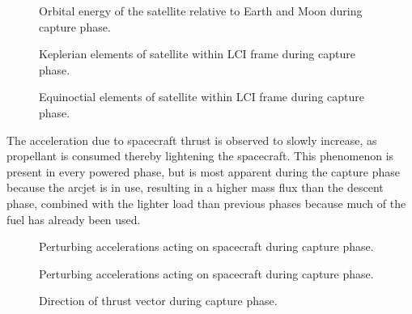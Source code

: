 \begin{figure}
\centering
\def\svgwidth{\figurewidth}

\caption{Orbital energy of the satellite relative to Earth and Moon during capture phase.}
\label{fig:Capture-orbeng}
\end{figure}

\begin{figure}
\centering
\def\svgwidth{\figurewidth}

\caption{Keplerian elements of satellite within LCI frame during capture phase.}
\label{fig:Capture-kep-lci}
\end{figure}

\begin{figure}
\centering
\def\svgwidth{\figurewidth}

\caption{Equinoctial elements of satellite within LCI frame during capture phase.}
\label{fig:Capture-mee}
\end{figure}

The acceleration due to spacecraft thrust is observed to slowly increase, as propellant is consumed thereby lightening the spacecraft. This phenomenon is present in every powered phase, but is most apparent during the capture phase because the arcjet is in use, resulting in a higher mass flux than the descent phase, combined with the lighter load than previous phases because much of the fuel has already been used.

\begin{figure}
\centering
\def\svgwidth{\figurewidth}

\caption{Perturbing accelerations acting on spacecraft during capture phase.}
\label{fig:Capture-pert}
\end{figure}

\begin{figure}
\centering
\def\svgwidth{\figurewidth}

\caption{Perturbing accelerations acting on spacecraft during capture phase.}
\label{fig:Capture-pert2}
\end{figure}

\begin{figure}
\centering
\def\svgwidth{\figurewidth}

\caption{Direction of thrust vector during capture phase.}
\label{fig:Capture-thrust}
\end{figure}


